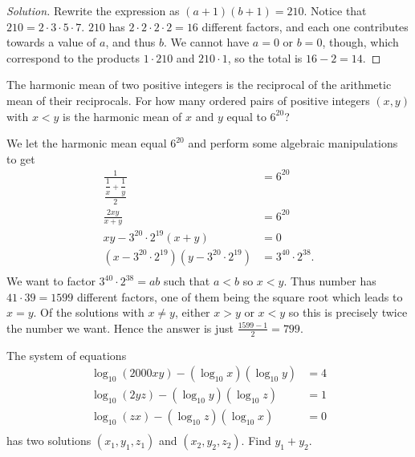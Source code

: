 \ifsolutions
\begin{proof}[Solution]
Rewrite the expression as $(a + 1)(b + 1) = 210$. Notice that $210 = 2 \cdot 3
\cdot 5 \cdot 7$. $210$ has $2 \cdot 2 \cdot 2 \cdot 2 = 16$ different factors,
and each one contributes towards a value of $a$, and thus $b$. We cannot have $a
= 0$ or $b = 0$, though, which correspond to the products $1 \cdot 210$ and $210
\cdot 1$, so the total is $16 - 2 = \boxed{14}$.
\end{proof}
\fi

\begin{prb}[1996 AIME-8]
The harmonic mean of two positive integers is the reciprocal of the arithmetic
mean of their reciprocals. For how many ordered pairs of positive integers
$(x, y)$ with $x < y$ is the harmonic mean of $x$ and $y$ equal to $6^{20}$?
\end{prb}

\ifsolutions
We let the harmonic mean equal $6^{20}$ and perform some algebraic manipulations
to get
\[ \begin{aligned}
\frac{1}{\dfrac{\dfrac{1}{x} + \dfrac{1}{y}}{2}} &= 6^{20} \\
\frac{2xy}{x + y} &= 6^{20} \\
xy - 3^{20} \cdot 2^{19} (x + y) &= 0 \\
(x - 3^{20} \cdot 2^{19}) (y - 3^{20} \cdot 2^{19}) &= 3^{40} \cdot 2^{38}. \\
\end{aligned} \]
We want to factor $3^{40} \cdot 2^{38} = ab$ such that $a < b$ so $x < y$. Thus
number has $41 \cdot 39 = 1599$ different factors, one of them being the square
root which leads to $x = y$. Of the solutions with $x \neq y$, either $x > y$ or
$x < y$ so this is precisely twice the number we want. Hence the answer is just
$\frac{1599 - 1}{2} = \boxed{799}$.
\fi

\begin{prb}[2000 AIME I-9]
The system of equations
\[ \begin{aligned}
\log_{10}(2000xy) - (\log_{10}x) (\log_{10}y) &= 4 \\
\log_{10}(2yz) - (\log_{10}y)(\log_{10}z) &= 1 \\
\log_{10}(zx) - (\log_{10}z)(\log_{10}x) &= 0 \\
\end{aligned} \]
has two solutions $(x_1, y_1, z_1)$ and $(x_2, y_2, z_2)$. Find $y_1 + y_2$.
\end{prb}

